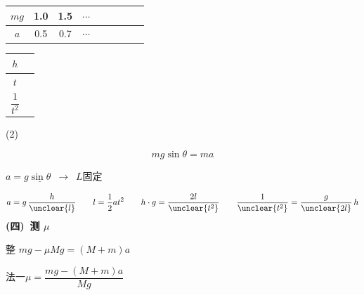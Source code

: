 
\begin{center}
\begin{tabular}{|c|c|c|c|c|c|c|c|c|}
\hline
$mg$ & 1.0 & 1.5 & $\cdots$ & & & & & \\
\hline
$a$ & 0.5 & 0.7 & $\cdots$ & & & & & \\
\hline
\end{tabular}
\end{center}
\begin{center}
\begin{tabular}{|c|p{6cm}|}
\hline
$h$ & \\
\hline
$t$ & \\
\hline
$\dfrac{1}{t^2}$ & \\
\hline
\end{tabular}
\end{center}


(2)




\[
mg\sin\theta=ma
\]

$a=g\underline{\sin\theta}$\ $\to$\ $L$固定\quad {} %


\[
a=g\,\frac{h}{\unclear{l}}\qquad l=\frac{1}{2}at^2\qquad h\cdot g=\frac{2l}{\unclear{t^2}}\qquad \frac{1}{\unclear{t^2}}=\frac{g}{\unclear{2l}}\,h
\]
\textbf{(四)\ 测 $\mu$}


整 $mg-\mu Mg=(M+m)a$ %

法一\quad $\mu=\dfrac{mg-(M+m)a}{Mg}$


